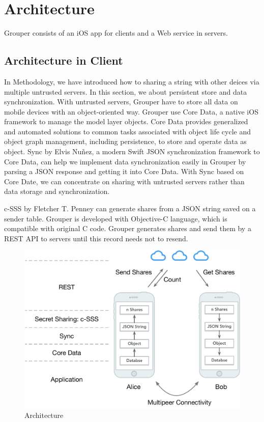 \documentclass[twocolumn,10pt]{article}
\begin{document}
\section{Architecture}
Grouper consists of an iOS app for clients and a Web service in servers.

\subsection{Architecture in Client}
In Methodology, we have introduced how to sharing a string with other deices via multiple untrusted servers. In this section, we about persistent store and data synchronization. With untrusted servers, Grouper have to store all data on mobile devices with an object-oriented way. Grouper use Core Data\cite{coredata}, a native iOS framework to manage the model layer objects. Core Data provides generalized and automated solutions to common tasks associated with object life cycle and object graph management, including persistence, to store and operate data as object. Sync\cite{sync} by Elvis Nuñez, a modern Swift JSON synchronization framework to Core Data, can help we implement data synchronization easily in Grouper by parsing a JSON response and getting it into Core Data. With Sync based on Core Date, we can concentrate on sharing with untrusted servers rather than data storage and synchronization.

c-SSS by Fletcher T. Penney can generate shares from a JSON string saved on a sender table. Grouper is developed with Objective-C language, which is compatible with original C code. Grouper generates shares and send them by a REST API to servers until this record needs not to resend.

\begin{figure}[t]
\centering
\includegraphics[scale=0.4]{architecture}
\caption{Architecture}
\end{figure}
\end{document}
